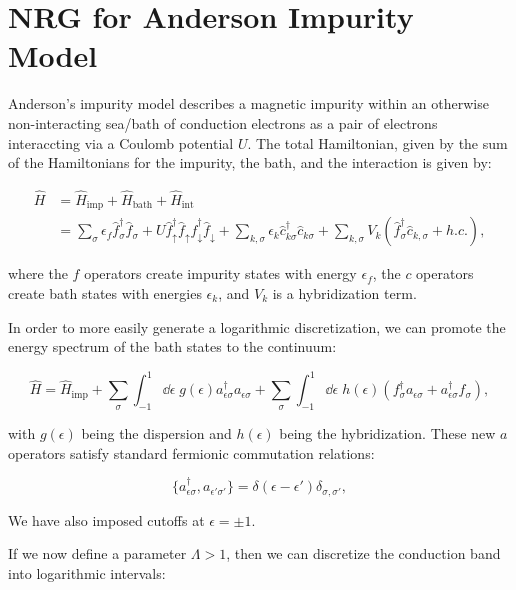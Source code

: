 \section{NRG for Anderson Impurity Model}

Anderson's impurity model describes a magnetic impurity within an otherwise non-interacting sea/bath of conduction electrons as a pair of electrons interaccting via a Coulomb potential $U$. The total Hamiltonian, given by the sum of the Hamiltonians for the impurity, the bath, and the interaction is given by:

\begin{align}
  \hat{H} &= \hat{H}_{\text{imp}} + \hat{H}_{\text{bath}} + \hat{H}_{\text{int}} \\
          &= \sum_\sigma \epsilon_f \hat{f}^\dagger_\sigma \hat{f}_\sigma + U\hat{f}^\dagger_\uparrow \hat{f}_\uparrow \hat{f}^\dagger_\downarrow \hat{f}_\downarrow + \sum_{k,\sigma}\epsilon_k \hat{c}^\dagger_{k\sigma}\hat{c}_{k\sigma} + \sum_{k,\sigma}V_k(\hat{f}^\dagger_\sigma \hat{c}_{k,\sigma} + h.c.),
\end{align}

where the $f$ operators create impurity states with energy $\epsilon_f$, the $c$ operators create bath states with energies $\epsilon_k$, and $V_k$ is a hybridization term.

In order to more easily generate a logarithmic discretization, we can promote the energy spectrum of the bath states to the continuum:

\begin{equation}
  \hat{H} = \hat{H}_{\mathrm{imp}} + \sum_\sigma \int_{-1}^1 \dd\epsilon \; g(\epsilon) a^\dagger_{\epsilon\sigma}a_{\epsilon\sigma} + \sum_\sigma \int_{-1}^1 \dd\epsilon \; h(\epsilon)(f^\dagger_\sigma a_{\epsilon\sigma} + a^\dagger_{\epsilon\sigma}f_{\sigma}),
\end{equation}

with $g(\epsilon)$ being the dispersion and $h(\epsilon)$ being the hybridization. These new $a$ operators satisfy standard fermionic commutation relations:

\begin{equation}
  \{a^\dagger_{\epsilon\sigma}, a_{\epsilon'\sigma'}\} = \delta(\epsilon-\epsilon')\delta_{\sigma,\sigma'},
\end{equation}

We have also imposed cutoffs at $\epsilon=\pm1$.

If we now define a parameter $\Lambda > 1$, then we can discretize the conduction band into logarithmic intervals:

